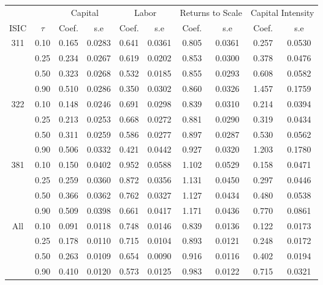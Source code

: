 \begin{table}[H]
\centering
\begin{tabular}{cccccccccc}
  \hline\hline & & \multicolumn{2}{c}{Capital}  & \multicolumn{2}{c}{Labor} & \multicolumn{2}{c}{Returns to Scale} & \multicolumn{2}{c}{Capital Intensity}\\ \cmidrule(lr){3-4} \cmidrule(lr){5-6} \cmidrule(lr){7-8} \cmidrule(lr){9-10}ISIC & $\tau$ & Coef. & s.e & Coef. & s.e & Coef. & s.e & Coef. & s.e \\ 
  \hline
311 & 0.10 & 0.165 & 0.0283 & 0.641 & 0.0361 & 0.805 & 0.0361 & 0.257 & 0.0530 \\ 
   & 0.25 & 0.234 & 0.0267 & 0.619 & 0.0202 & 0.853 & 0.0300 & 0.378 & 0.0476 \\ 
   & 0.50 & 0.323 & 0.0268 & 0.532 & 0.0185 & 0.855 & 0.0293 & 0.608 & 0.0582 \\ 
   & 0.90 & 0.510 & 0.0286 & 0.350 & 0.0302 & 0.860 & 0.0326 & 1.457 & 0.1759 \\ 
  322 & 0.10 & 0.148 & 0.0246 & 0.691 & 0.0298 & 0.839 & 0.0310 & 0.214 & 0.0394 \\ 
   & 0.25 & 0.213 & 0.0253 & 0.668 & 0.0272 & 0.881 & 0.0290 & 0.319 & 0.0434 \\ 
   & 0.50 & 0.311 & 0.0259 & 0.586 & 0.0277 & 0.897 & 0.0287 & 0.530 & 0.0562 \\ 
   & 0.90 & 0.506 & 0.0332 & 0.421 & 0.0442 & 0.927 & 0.0320 & 1.203 & 0.1780 \\ 
  381 & 0.10 & 0.150 & 0.0402 & 0.952 & 0.0588 & 1.102 & 0.0529 & 0.158 & 0.0471 \\ 
   & 0.25 & 0.259 & 0.0360 & 0.872 & 0.0356 & 1.131 & 0.0450 & 0.297 & 0.0446 \\ 
   & 0.50 & 0.366 & 0.0362 & 0.762 & 0.0327 & 1.127 & 0.0434 & 0.480 & 0.0538 \\ 
   & 0.90 & 0.509 & 0.0398 & 0.661 & 0.0417 & 1.171 & 0.0436 & 0.770 & 0.0861 \\ 
  All & 0.10 & 0.091 & 0.0118 & 0.748 & 0.0146 & 0.839 & 0.0136 & 0.122 & 0.0173 \\ 
   & 0.25 & 0.178 & 0.0110 & 0.715 & 0.0104 & 0.893 & 0.0121 & 0.248 & 0.0172 \\ 
   & 0.50 & 0.263 & 0.0109 & 0.654 & 0.0090 & 0.916 & 0.0116 & 0.402 & 0.0194 \\ 
   & 0.90 & 0.410 & 0.0120 & 0.573 & 0.0125 & 0.983 & 0.0122 & 0.715 & 0.0321 \\ 
   \hline
\end{tabular}
\end{table}

